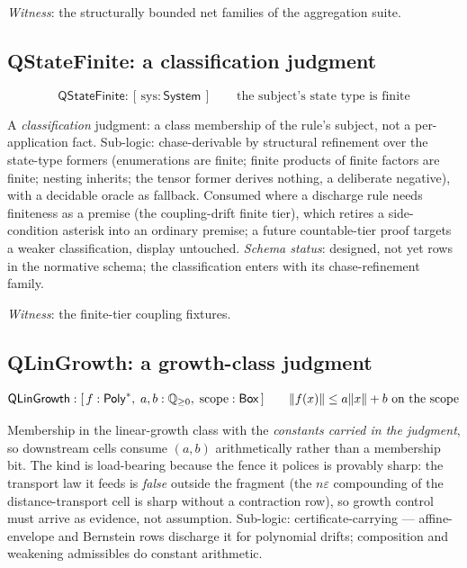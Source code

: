 \emph{Witness}: the structurally bounded net families of the
aggregation suite.



\subsection{QStateFinite: a classification judgment}
\label{sec:spec-lang-qstatefinite}

\[
\mathsf{QStateFinite} : [\, \mathrm{sys} : \mathsf{System} \,]
\qquad
\text{the subject's state type is finite}
\]

A \emph{classification} judgment: a class membership of the rule's
subject, not a per-application fact. Sub-logic: chase-derivable by
structural refinement over the state-type formers (enumerations are
finite; finite products of finite factors are finite; nesting
inherits; the tensor former derives nothing, a deliberate negative),
with a decidable oracle as fallback. Consumed where a discharge rule
needs finiteness as a premise (the coupling-drift finite tier), which
retires a side-condition asterisk into an ordinary premise; a future
countable-tier proof targets a weaker classification, display
untouched. \emph{Schema status}: designed, not yet rows in the
normative schema; the classification enters with its
chase-refinement family.

\emph{Witness}: the finite-tier coupling fixtures.



\subsection{QLinGrowth: a growth-class judgment}
\label{sec:spec-lang-qlingrowth}

\[
\mathsf{QLinGrowth} : [\, f : \mathsf{Poly}^{*},\;
  a, b : \mathbb{Q}_{\ge 0},\;
  \mathrm{scope} : \mathsf{Box} \,]
\qquad
\lVert f(x) \rVert \le a \lVert x \rVert + b \ \text{on the scope}
\]

Membership in the linear-growth class with the \emph{constants
carried in the judgment}, so downstream cells consume $(a, b)$
arithmetically rather than a membership bit. The kind is load-bearing
because the fence it polices is provably sharp: the transport law it
feeds is \emph{false} outside the fragment (the $n\varepsilon$
compounding of the distance-transport cell is sharp without a
contraction row), so growth control must arrive as evidence, not
assumption. Sub-logic: certificate-carrying --- affine-envelope and
Bernstein rows discharge it for polynomial drifts; composition and
weakening admissibles do constant arithmetic.

